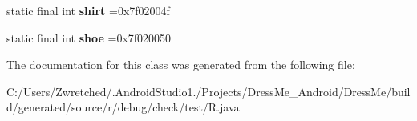 \begin{DoxyCompactItemize}
\item 
\hypertarget{classcheck_1_1test_1_1_r_1_1drawable_ad8702d88464201d739c177a98d881850}{}static final int {\bfseries shirt} =0x7f02004f\label{classcheck_1_1test_1_1_r_1_1drawable_ad8702d88464201d739c177a98d881850}

\item 
\hypertarget{classcheck_1_1test_1_1_r_1_1drawable_af4cc1aea699f173f53dffd2f5708a615}{}static final int {\bfseries shoe} =0x7f020050\label{classcheck_1_1test_1_1_r_1_1drawable_af4cc1aea699f173f53dffd2f5708a615}

\end{DoxyCompactItemize}


The documentation for this class was generated from the following file\+:\begin{DoxyCompactItemize}
\item 
C\+:/\+Users/\+Zwretched/.\+Android\+Studio1./\+Projects/\+Dress\+Me\+\_\+\+Android/\+Dress\+Me/build/generated/source/r/debug/check/test/R.\+java\end{DoxyCompactItemize}
